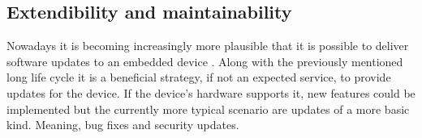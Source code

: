 \begin{comment}
Understandably, the world of safety-critical device manufacturers is a conservative one indeed. [...]

Imagine two device architectures \textit{A} and \textit{B}. Architecture \textit{A} has the potential to create perfectly reusable software, much better than architecture \textit{B}. But it is possible that \textit{A} introduces expensive safety problems later in the development process.
In this case architecture \textit{A} has a much higher associated risk but also  some positive variance. This example is very abstract and some more concrete architectural risks will be introduced in future sections. 

Which risks are considered "worthwhile" is very dependent on other circumstances and even in this example it is not clear what would be the better architecture (even assuming that they have no other defining criteria). However, just considering the possible risks of architectures can give important insights into when they should be used.
[Example is confusing and section seems incomplete]
\section{Future-proof design}
Whenever there is an associated hardware , future-proof design is especially important. Software can be reproduced and shipped with practically no cost but devices can not. Any features that have been forgotten can only be added once the next major hardware revision is released.

Safety-critical devices are particularly notable in this respect, since they are often very complex and have an expensive engineering process. Airplanes are typically used for 3 decades and hospitals have notoriously tight budgets and have to squeeze as much lifetime out of their devices as possible. 
\end{comment}
\subsection{Extendibility and maintainability}
Nowadays it is becoming increasingly more plausible that it is possible to deliver software updates to an embedded device \cite{OndrejKachman.2016}. Along with the previously mentioned long life cycle it is a beneficial strategy, if not an expected service, to provide updates for the device.
If the device's hardware supports it, new features could be implemented but the currently more typical scenario are updates of a more basic kind. Meaning, bug fixes and security updates.

